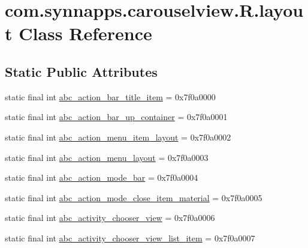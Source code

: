 \hypertarget{classcom_1_1synnapps_1_1carouselview_1_1_r_1_1layout}{}\section{com.\+synnapps.\+carouselview.\+R.\+layout Class Reference}
\label{classcom_1_1synnapps_1_1carouselview_1_1_r_1_1layout}
\subsection*{Static Public Attributes}
\begin{DoxyCompactItemize}
\item 
static final int \mbox{\hyperlink{classcom_1_1synnapps_1_1carouselview_1_1_r_1_1layout_afbae6c5eea6bc6999392d96d3991296a}{abc\+\_\+action\+\_\+bar\+\_\+title\+\_\+item}} = 0x7f0a0000
\item 
static final int \mbox{\hyperlink{classcom_1_1synnapps_1_1carouselview_1_1_r_1_1layout_ae455eec2c3fa081670f207bd03f54ca1}{abc\+\_\+action\+\_\+bar\+\_\+up\+\_\+container}} = 0x7f0a0001
\item 
static final int \mbox{\hyperlink{classcom_1_1synnapps_1_1carouselview_1_1_r_1_1layout_a6dfe63de7cd8da404164be4742b4e287}{abc\+\_\+action\+\_\+menu\+\_\+item\+\_\+layout}} = 0x7f0a0002
\item 
static final int \mbox{\hyperlink{classcom_1_1synnapps_1_1carouselview_1_1_r_1_1layout_a44f7170e7af2bb20562de61283acdae6}{abc\+\_\+action\+\_\+menu\+\_\+layout}} = 0x7f0a0003
\item 
static final int \mbox{\hyperlink{classcom_1_1synnapps_1_1carouselview_1_1_r_1_1layout_a4c3ac5e4100582baf4e7abb250ccaa62}{abc\+\_\+action\+\_\+mode\+\_\+bar}} = 0x7f0a0004
\item 
static final int \mbox{\hyperlink{classcom_1_1synnapps_1_1carouselview_1_1_r_1_1layout_a25b5207be9bbd36d99a4c74644116f0e}{abc\+\_\+action\+\_\+mode\+\_\+close\+\_\+item\+\_\+material}} = 0x7f0a0005
\item 
static final int \mbox{\hyperlink{classcom_1_1synnapps_1_1carouselview_1_1_r_1_1layout_a3cb9624ff1bb55d2db3dffc68623901b}{abc\+\_\+activity\+\_\+chooser\+\_\+view}} = 0x7f0a0006
\item 
static final int \mbox{\hyperlink{classcom_1_1synnapps_1_1carouselview_1_1_r_1_1layout_a4d4ad3fafda9b45393c9e361237ba0b3}{abc\+\_\+activity\+\_\+chooser\+\_\+view\+\_\+list\+\_\+item}} = 0x7f0a0007
\item 

\end{DoxyCompactItemize}
